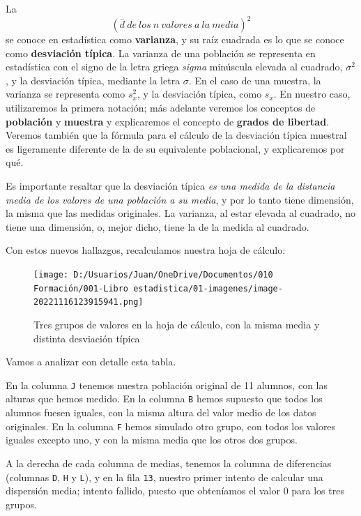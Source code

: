 \documentclass[
  letterpaper,
  DIV=11,
  numbers=noendperiod,
  oneside]{scrreprt}
\begin{document}
La \[(\bar{d}{\ }de{\ }los{\ }n{\ }valores{\ }a{\ }la{\ }media)^2\] se
conoce en estadística como \textbf{varianza}, y su raíz cuadrada es lo
que se conoce como \textbf{desviación típica}. La varianza de una
población se representa en estadística con el signo de la letra griega
\emph{sigma} minúscula elevada al cuadrado, \(\sigma^2\), y la
desviación típica, mediante la letra \(\sigma\). En el caso de una
muestra, la varianza se representa como \(s_x^2\), y la desviación
típica, como \(s_x\). En nuestro caso, utilizaremos la primera notación;
más adelante veremos los conceptos de \textbf{población} y
\textbf{muestra} y explicaremos el concepto de \textbf{grados de
libertad}. Veremos también que la fórmula para el cálculo de la
desviación típica muestral es ligeramente diferente de la de su
equivalente poblacional, y explicaremos por qué.

Es importante resaltar que la desviación típica \emph{es una medida de
la distancia media de los valores de una población a su media}, y por lo
tanto tiene dimensión, la misma que las medidas originales. La varianza,
al estar elevada al cuadrado, no tiene una dimensión, o, mejor dicho,
tiene la de la medida al cuadrado.

Con estos nuevos hallazgos, recalculamos nuestra hoja de cálculo:

\begin{figure}

{\centering \texttt{[image: D:/Usuarios/Juan/OneDrive/Documentos/010 Formación/001-Libro estadistica/01-imagenes/image-20221116123915941.png]}

}

\caption{Tres grupos de valores en la hoja de cálculo, con la misma
media y distinta desviación típica}

\end{figure}

Vamos a analizar con detalle esta tabla.

En la columna \texttt{J} tenemos nuestra población original de 11
alumnos, con las alturas que hemos medido. En la columna \texttt{B}
hemos supuesto que todos los alumnos fuesen iguales, con la misma altura
del valor medio de los datos originales. En la columna \texttt{F} hemos
simulado otro grupo, con todos los valores iguales excepto uno, y con la
misma media que los otros dos grupos.

A la derecha de cada columna de medias, tenemos la columna de
diferencias (columnas \texttt{D}, \texttt{H} y \texttt{L}), y en la fila
\texttt{13}, nuestro primer intento de calcular una dispersión media;
intento fallido, puesto que obteníamos el valor \(0\) para los tres
grupos.
\end{document}
